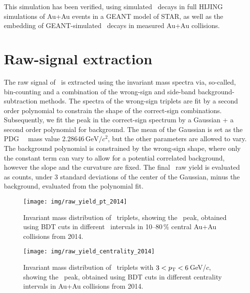 This simulation has been verified, using simulated \Lambdacpm\ decays in full HIJING simulations of Au+Au events in a GEANT model of STAR, as well as the embedding of GEANT-simulated \Lambdacpm\ decays in measured Au+Au collisions\@.

\section{\label{raw}Raw-signal extraction}

The raw signal of \Lambdacpm\ is extracted using the invariant mass spectra via, so-called, bin-counting and a combination of the wrong-sign and side-band background-subtraction methods. The spectra of the wrong-sign triplets are fit by a second order polynomial to constrain the shape of the correct-sign combinations. Subsequently, we fit the peak in the correct-sign spectrum by a Gaussian + a second order polynomial for background. The mean of the Gaussian is set as the PDG~\cite{PDG} \Lambdac\ mass value 2.28646$\,\text{GeV}/c^2$, but the other parameters are allowed to vary. The background polynomial is constrained by the wrong-sign shape, where only the constant term can vary to allow for a potential correlated background, however the slope and the curvature are fixed. The final \Lambdacpm\ raw yield is evaluated as counts, under 3 standard deviations of the center of the Gaussian, minus the background, evaluated from the polynomial fit.

\begin{figure}[!p]
\vspace{-0.7cm}
\centering
\texttt{[image: img/raw\_yield\_pt\_2014]}
\vspace{-0.5cm}
\caption{\label{raw_sig_2014_pt}Invariant mass distribution of \pKpi\ triplets, showing the \Lambdac\ peak, obtained using BDT cuts in different \pt\ intervals in 10--80$\,\%$ central Au+Au collisions from 2014.}
\end{figure}

\begin{figure}[!p]
\centering
\texttt{[image: img/raw\_yield\_centrality\_2014]}
\vspace{-0.5cm}
\caption{\label{raw_sig_2014_centrality}Invariant mass distribution of \pKpi\ triplets with $3 <{p_{\mathrm{T}}} < 6\,$GeV/$c$, showing the \Lambdac\ peak, obtained using BDT cuts in different centrality intervals in Au+Au collisions from 2014.}
\end{figure}

